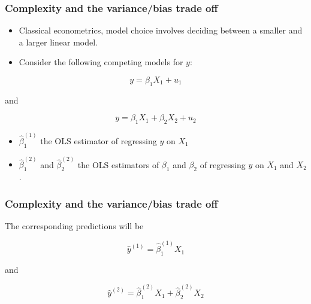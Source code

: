 \documentclass[
  shownotes,
  xcolor={svgnames},
  hyperref={colorlinks,citecolor=DarkBlue,linkcolor=DarkRed,urlcolor=DarkBlue}
  , aspectratio=169]{beamer}
\begin{document}
\begin{frame}
\frametitle{Complexity and the variance/bias trade off}

\begin{itemize}
\item Classical econometrics, model choice involves deciding between a smaller and a larger linear model. 
\item Consider the following competing models for $y$:

\end{itemize}
\bigskip
\begin{equation}
y=\beta_1 X_1 + u_1
\end{equation}

and

\begin{equation}
y=\beta_1 X_1 + \beta_2 X_2 + u_2
\end{equation}

\bigskip
\begin{itemize}
  \item $\hat \beta^{(1)}_1$ the OLS estimator of regressing $y$ on $X_1$
  \item  $\hat \beta^{(2)}_1$ and $\hat \beta^{(2)}_2$ the OLS estimators of $\beta_1$ and $\beta_2$ of regressing $y$ on $X_1$ and $X_2$. 
\end{itemize}
 
\end{frame}

\begin{frame}
\frametitle{Complexity and the variance/bias trade off}

The corresponding predictions will be

\begin{equation}\label{eq:3_2_3}
\hat{y}^{(1)}=\hat{\beta}^{(1)}_1 X_1 
\end{equation}

and

\begin{equation}\label{eq:3_2_4}
\hat{y}^{(2)}=\hat{\beta}^{(2)}_1 X_1 + \hat{\beta}^{(2)}_2 X_2 
\end{equation}

\end{frame}
\end{document}
